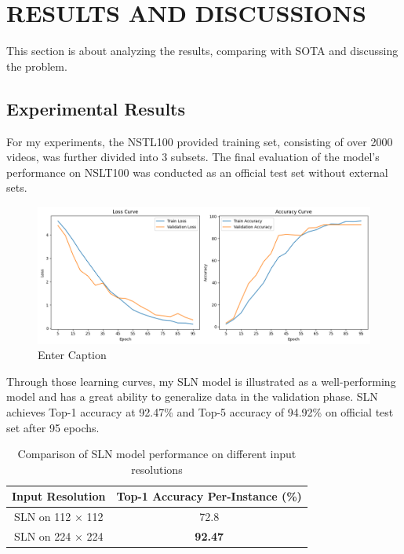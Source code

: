 \documentclass{article}
\begin{document}
\section{RESULTS AND DISCUSSIONS}

This section is about analyzing the results, comparing with SOTA and discussing the problem.

\subsection{Experimental Results}

For my experiments, the NSTL100 provided training set, consisting of over 2000 videos, was further divided into 3 subsets. The final evaluation of the model’s performance on NSLT100 was conducted as an official test set without external sets.

\begin{figure}[H]
    \centering
    \includegraphics[width=1\linewidth]{Fig/learning_curves.png}
    \caption{Enter Caption}
    \label{fig:learningcurves}
\end{figure}

Through those learning curves, my SLN model is illustrated as a well-performing model and has a great ability to generalize data in the validation phase. SLN achieves Top-1 accuracy at 92.47\% and Top-5 accuracy of 94.92\% on official test set after 95 epochs.

\begin{table}[htbp]
\centering
\label{tab:resolution_comparison}
\begin{tabular}{|c|c|}
\hline
\textbf{Input Resolution} & \textbf{Top-1 Accuracy Per-Instance (\%)}\\
\hline
SLN on 112 × 112 & 72.8  \\
SLN on 224 × 224 & \textbf{92.47} \\
\hline
\end{tabular}
\caption{Comparison of SLN model performance on different input resolutions}
\end{table}
\end{document}

